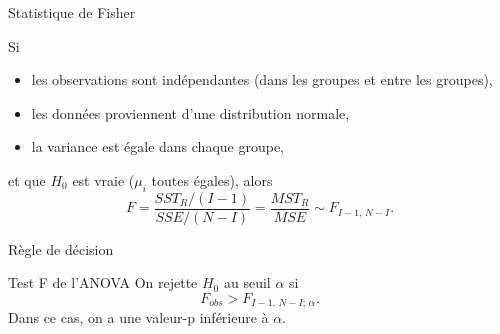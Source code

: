 \documentclass{BeamerTemplate}
\begin{document}
\begin{frame}[t]{Statistique de Fisher}

\begin{thm}
Si
\begin{itemize}
  \item les observations sont \alert{indépendantes} (dans les groupes et entre les groupes),
  \item les données proviennent d'une distribution \alert{normale},
  \item la \alert{variance est égale} dans chaque groupe,
\end{itemize}
et que $H_0$ est vraie ($\mu_i$ toutes égales), alors
\[
F=\frac{SST_R/(I-1)}{SSE/(N-I)}=\frac{MST_R}{MSE}\sim F_{I-1,\,N-I}.
\]
\end{thm}

\end{frame}

\begin{frame}[t]{Règle de décision}

\begin{Boite}{Test F de l'ANOVA}
On rejette $H_0$ au seuil $\alpha$ si
\[
F_{obs} > F_{I-1,\,N-I;\,\alpha}.
\]
Dans ce cas, on a une valeur-p inférieure à $\alpha$.
\end{Boite}

\begin{center}
\end{center}

\end{frame}
\end{document}
